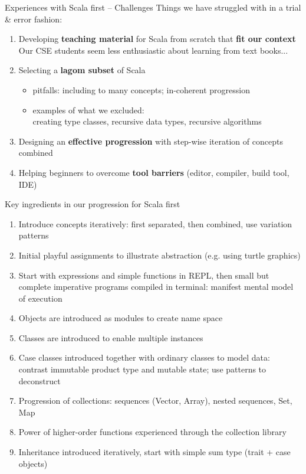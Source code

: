 \documentclass[aspectratio=169]{beamer}
\newenvironment{Slide}[1]%
  {\begin{frame}[environment=Slide]{#1}}
  {\end{frame}}%
\begin{document}
\begin{Slide}{Experiences with Scala first -- Challenges}
  Things we have struggled with in a trial \& error fashion:
  \begin{enumerate}
  \item Developing \textbf{teaching material} for Scala from scratch that \textbf{fit our context} \\ {\footnotesize Our CSE students seem less enthusiastic about learning from text books...}
  
  \item Selecting a \textbf{lagom subset} of Scala 
  \begin{itemize}
    \item pitfalls: including to many concepts; in-coherent progression 
    \item examples of what we excluded: \\creating type classes, recursive data types, recursive algorithms 
   \end{itemize}  
  \item Designing an \textbf{effective progression} with step-wise iteration of concepts combined
  \item Helping beginners to overcome \textbf{tool barriers} (editor, compiler, build tool, IDE)
  \end{enumerate}  
\end{Slide}


\begin{Slide}{Key ingredients in our progression for Scala first}
 \begin{enumerate}
 \item  Introduce concepts iteratively: first separated, then combined,  use variation patterns  
 \item Initial playful assignments to illustrate abstraction (e.g. using turtle graphics)
 \item Start with expressions and simple functions in REPL, then small but complete imperative programs compiled in terminal: manifest mental model of execution
  \item Objects are introduced as modules to create name space
  \item Classes are introduced to enable multiple instances
  \item Case classes introduced together with ordinary classes to model data: \\
   contrast immutable product type and mutable state; use patterns to deconstruct
  \item Progression of collections: sequences (Vector, Array), nested sequences, Set, Map 
  \item Power of higher-order functions experienced through the collection library
  \item Inheritance introduced iteratively, start with simple sum type (trait + case objects)
\end{enumerate}
\end{Slide}  
\end{document}
